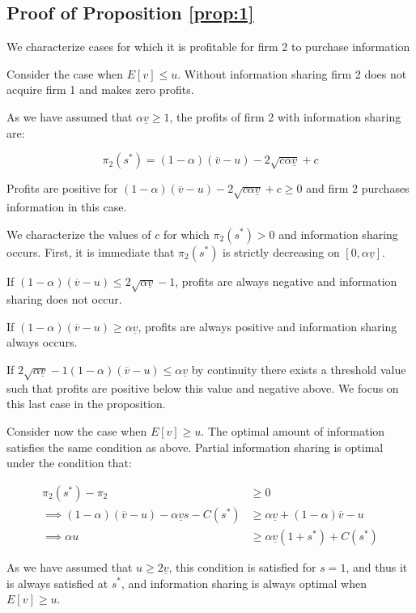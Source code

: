 \documentclass[a4paper,leqno]{article}%
\renewcommand{\a}{\alpha}
\newcommand{\uv}{\underline{v}}
\newcommand{\ov}{\overline{v}}
\begin{document}
\subsection{Proof of Proposition \ref{prop:1}}\label{prop:1p}

We characterize cases for which it is profitable for firm 2 to purchase information

Consider the case when $E[v]\leq u$. Without information sharing firm 2 does not acquire firm 1 and makes zero profits.

As we have assumed that $\a\uv\geq1$, the profits of firm 2 with information sharing are:

$$\pi_2(s^*)=(1-\a)(\ov -u)-2 \sqrt{c\a \uv}+c$$

Profits are positive for $(1-\a)(\ov -u)-2 \sqrt{c\a \uv}+c\geq0$ and firm 2 purchases information in this case. 

We characterize the values of $c$ for which $\pi_2(s^*)>0$ and information sharing occurs. First, it is immediate that $\pi_2(s^*)$ is strictly decreasing on $[0,\a\uv]$. 

If $(1-\a)(\ov -u)\leq2 \sqrt{\a \uv}-1$, profits are always negative and information sharing does not occur.

If $(1-\a)(\ov -u)\geq\a \uv$, profits are always positive and information sharing always occurs.

If $2 \sqrt{\a \uv}-1(1-\a)(\ov -u)\leq\a \uv$ by continuity there exists a threshold value such that profits are positive below this value and negative above. We focus on this last case in the proposition.


Consider now the case when $E[v]\geq u$. The optimal amount of information satisfies the same condition as above. Partial information sharing is optimal under the condition that:

\begin{equation}
    \begin{aligned}
      \pi_2(s^*)-\pi_2&\geq0\\
      \implies (1-\a)(\ov -u)-\a \uv s-C(s^*)&\geq \a\uv+(1-\a)\ov-u\\
      \implies \a u&\geq \a\uv(1+s^*)+C(s^*)
    \end{aligned}
\end{equation}

As we have assumed that $u\geq 2 \uv$, this condition is satisfied for $s=1$, and thus it is always satisfied at $s^*$, and information sharing is always optimal when $E[v]\geq u$.
\end{document}
